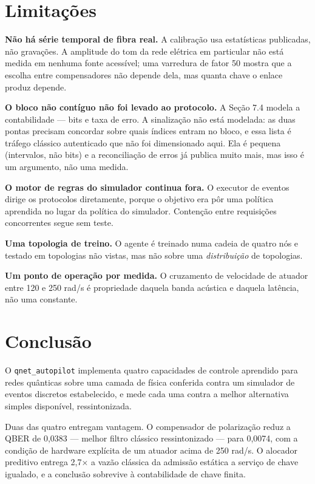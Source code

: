 \documentclass[12pt]{article}
\begin{document}
\section{Limitações}

\textbf{Não há série temporal de fibra real.} A calibração usa estatísticas
publicadas, não gravações. A amplitude do tom da rede elétrica em particular não
está medida em nenhuma fonte acessível; uma varredura de fator 50 mostra que a
escolha entre compensadores não depende dela, mas quanta chave o enlace produz
depende.

\textbf{O bloco não contíguo não foi levado ao protocolo.} A Seção 7.4 modela a
contabilidade --- bits e taxa de erro. A sinalização não está modelada: as duas
pontas precisam concordar sobre quais índices entram no bloco, e essa lista é
tráfego clássico autenticado que não foi dimensionado aqui. Ela é pequena
(intervalos, não bits) e a reconciliação de erros já publica muito mais, mas
isso é um argumento, não uma medida.

\textbf{O motor de regras do simulador continua fora.} O executor de eventos
dirige os protocolos diretamente, porque o objetivo era pôr uma política
aprendida no lugar da política do simulador. Contenção entre requisições
concorrentes segue sem teste.

\textbf{Uma topologia de treino.} O agente é treinado numa cadeia de quatro nós
e testado em topologias não vistas, mas não sobre uma \emph{distribuição} de
topologias.

\textbf{Um ponto de operação por medida.} O cruzamento de velocidade de atuador
entre 120 e 250 rad/s é propriedade daquela banda acústica e daquela latência,
não uma constante.

\section{Conclusão}

O \texttt{qnet\_autopilot} implementa quatro capacidades de controle aprendido
para redes quânticas sobre uma camada de física conferida contra um simulador
de eventos discretos estabelecido, e mede cada uma contra a melhor alternativa
simples disponível, ressintonizada.

Duas das quatro entregam vantagem. O compensador de polarização reduz a QBER de
0,0383 --- melhor filtro clássico ressintonizado --- para 0,0074, com a condição
de hardware explícita de um atuador acima de 250 rad/s. O alocador preditivo
entrega 2,7$\times$ a vazão clássica da admissão estática a serviço de chave
igualado, e a conclusão sobrevive à contabilidade de chave finita.
\end{document}
